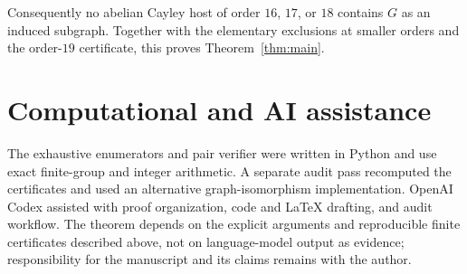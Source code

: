 \documentclass[11pt]{article}
\begin{document}
Consequently no abelian Cayley host of order $16$, $17$, or $18$ contains
$G$ as an induced subgraph.  Together with the elementary exclusions at
smaller orders and the order-$19$ certificate, this proves
Theorem~\ref{thm:main}.

\section*{Computational and AI assistance}

The exhaustive enumerators and pair verifier were written in Python and
use exact finite-group and integer arithmetic.  A separate audit pass
recomputed the certificates and used an alternative graph-isomorphism
implementation.  OpenAI Codex assisted with proof organization, code and
LaTeX drafting, and audit workflow.  The theorem depends on the explicit
arguments and reproducible finite certificates described above, not on
language-model output as evidence; responsibility for the manuscript and
its claims remains with the author.



\end{document}
